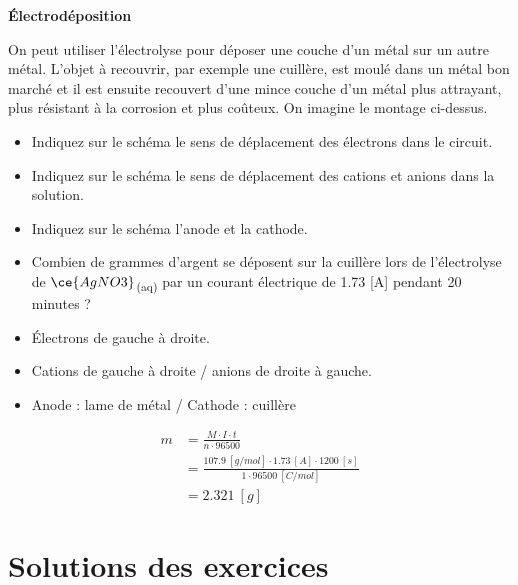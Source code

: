 \documentclass[
  11pt,
  french,
  a4paper,
  openany]{book}
\providecommand{\tightlist}{%
  \setlength{\itemsep}{0pt}\setlength{\parskip}{0pt}}
\begin{document}
\begin{Exercise}

\textbf{Électrodéposition}

On peut utiliser l'électrolyse pour déposer une couche d'un métal sur un autre métal. L'objet à recouvrir, par exemple une cuillère, est moulé dans un métal bon marché et il est ensuite recouvert d'une mince couche d'un métal plus attrayant, plus résistant à la corrosion et plus coûteux. On imagine le montage ci-dessus.

\begin{itemize}
\tightlist
\item
  Indiquez sur le schéma le sens de déplacement des électrons dans le circuit.
\item
  Indiquez sur le schéma le sens de déplacement des cations et anions dans la solution.
\item
  Indiquez sur le schéma l'anode et la cathode.
\item
  Combien de grammes d'argent se déposent sur la cuillère lors de l'électrolyse de \(\ce{AgNO3}\)\textsubscript{(aq)} par un courant électrique de 1.73 {[}A{]} pendant 20 minutes ?
\end{itemize}



\end{Exercise}

\begin{Answer}

\begin{itemize}
\tightlist
\item
  Électrons de gauche à droite.
\item
  Cations de gauche à droite / anions de droite à gauche.
\item
  Anode : lame de métal / Cathode : cuillère
\end{itemize}

\[
\begin{split}
  m &= \frac{M \cdot I \cdot t}{n \cdot 96500} \\
  &= \frac{107.9\ [g/mol] \cdot 1.73\ [A] \cdot 1200\ [s]}{1 \cdot 96500\ [C/mol]} \\
  &= 2.321\ [g]
\end{split}
\]


\end{Answer}

\clearpage

\section{Solutions des exercices} \shipoutAnswer
\end{document}
